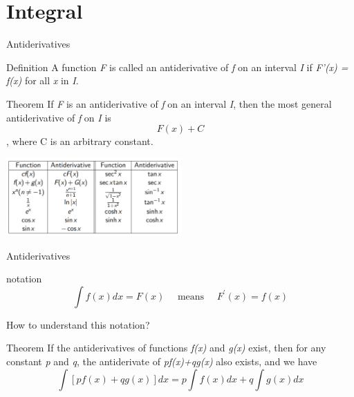 \section{Integral}
\begin{frame}{Antiderivatives}
    \begin{block}{Definition}
        A function \textit{F} is called an antiderivative of \textit{f} on an interval \textit{I} if \textit{F'(x) = f(x)} for all \textit{x} in \textit{I}.
    \end{block}
    \begin{block}{Theorem}
        If \textit{F} is an antiderivative of \textit{f} on an interval \textit{I}, then the most general antiderivative of \textit{f} on \textit{I} is $$F(x)+C$$,
        where C is an arbitrary constant.
    \end{block}
    \begin{center}
        \includegraphics[height=3cm]{res/anti.png}
    \end{center}

\end{frame}

\begin{frame}{Antiderivatives}
    \begin{block}{notation}
        $$
            \int f(x) d x=F(x) \quad \text { means } \quad F^{\prime}(x)=f(x)
        $$
    \end{block}
    How to understand this notation?
    \begin{block}{Theorem}
        If the antiderivatives of functions \textit{f(x)} and \textit{g(x)} exist, then for any constant \textit{p} and \textit{q}, the antiderivate of \textit{pf(x)+qg(x)} also exists, and we have
        $$\int[pf(x)+qg(x)]dx=p\int f(x)dx+q\int g(x)dx$$
    \end{block}
\end{frame}

